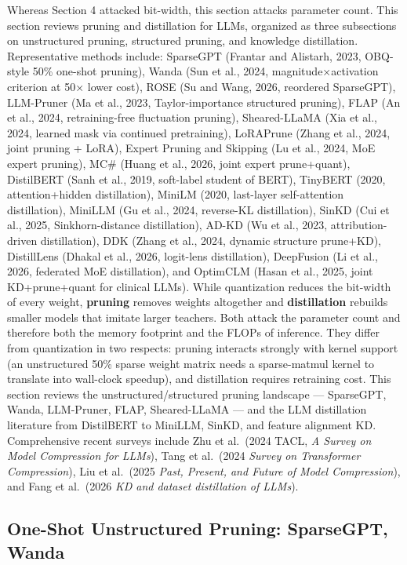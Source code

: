 \documentclass{article}
\begin{document}
Whereas Section 4 attacked bit-width, this section attacks parameter count. This section reviews pruning and distillation for LLMs, organized as three subsections on unstructured pruning, structured pruning, and knowledge distillation. Representative methods include: SparseGPT (Frantar and Alistarh, 2023, OBQ-style 50\% one-shot pruning), Wanda (Sun et al., 2024, magnitude×activation criterion at 50× lower cost), ROSE (Su and Wang, 2026, reordered SparseGPT), LLM-Pruner (Ma et al., 2023, Taylor-importance structured pruning), FLAP (An et al., 2024, retraining-free fluctuation pruning), Sheared-LLaMA (Xia et al., 2024, learned mask via continued pretraining), LoRAPrune (Zhang et al., 2024, joint pruning + LoRA), Expert Pruning and Skipping (Lu et al., 2024, MoE expert pruning), MC\# (Huang et al., 2026, joint expert prune+quant), DistilBERT (Sanh et al., 2019, soft-label student of BERT), TinyBERT (2020, attention+hidden distillation), MiniLM (2020, last-layer self-attention distillation), MiniLLM (Gu et al., 2024, reverse-KL distillation), SinKD (Cui et al., 2025, Sinkhorn-distance distillation), AD-KD (Wu et al., 2023, attribution-driven distillation), DDK (Zhang et al., 2024, dynamic structure prune+KD), DistillLens (Dhakal et al., 2026, logit-lens distillation), DeepFusion (Li et al., 2026, federated MoE distillation), and OptimCLM (Hasan et al., 2025, joint KD+prune+quant for clinical LLMs). While quantization reduces the bit-width of every weight, \textbf{pruning} removes weights altogether and \textbf{distillation} rebuilds smaller models that imitate larger teachers. Both attack the parameter count and therefore both the memory footprint and the FLOPs of inference. They differ from quantization in two respects: pruning interacts strongly with kernel support (an unstructured 50\% sparse weight matrix needs a sparse-matmul kernel to translate into wall-clock speedup), and distillation requires retraining cost. This section reviews the unstructured/structured pruning landscape --- SparseGPT, Wanda, LLM-Pruner, FLAP, Sheared-LLaMA --- and the LLM distillation literature from DistilBERT to MiniLLM, SinKD, and feature alignment KD. Comprehensive recent surveys include Zhu et al.~(2024 TACL, \emph{A Survey on Model Compression for LLMs}), Tang et al.~(2024 \emph{Survey on Transformer Compression}), Liu et al.~(2025 \emph{Past, Present, and Future of Model Compression}), and Fang et al.~(2026 \emph{KD and dataset distillation of LLMs}).

\subsection{One-Shot Unstructured Pruning: SparseGPT, Wanda}\label{one-shot-unstructured-pruning-sparsegpt-wanda}
\end{document}
